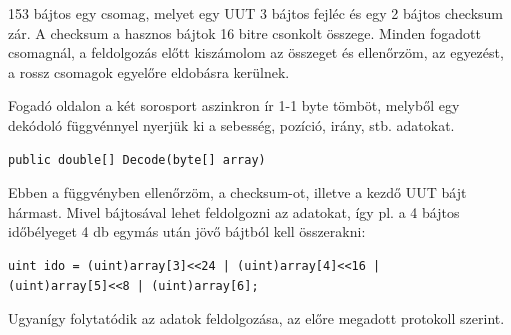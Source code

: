 \documentclass[12pt]{article}
\begin{document}
\begin{itemize}
153 bájtos egy csomag, melyet egy UUT  3 bájtos fejléc és egy 2 bájtos checksum zár. A checksum a hasznos bájtok 16 bitre csonkolt összege. Minden fogadott csomagnál, a feldolgozás el\H{o}tt kiszámolom az összeget és ellen\H{o}rzöm, az egyezést, a rossz csomagok egyel\H{o}re eldobásra kerülnek.

\begin{figure}[H]
	\centering
	\caption{}
	\label{fig:xvi}
\end{figure}

Fogadó oldalon a két sorosport aszinkron ír 1-1 byte tömböt, melyb\H{o}l egy dekódoló függvénnyel nyerjük ki a sebesség, pozíció, irány, stb. adatokat.

\begin{verbatim}
public double[] Decode(byte[] array)
\end{verbatim}

Ebben a függvényben ellen\H{o}rzöm, a checksum-ot, illetve a kezd\H{o} UUT bájt hármast.
Mivel bájtosával lehet feldolgozni az adatokat, így pl. a 4 bájtos id\H{o}bélyeget 4 db egymás után jöv\H{o} bájtból kell összerakni:

\begin{verbatim}
uint ido = (uint)array[3]<<24 | (uint)array[4]<<16 |
(uint)array[5]<<8 | (uint)array[6];
\end{verbatim}

Ugyanígy folytatódik az adatok feldolgozása, az el\H{o}re megadott protokoll szerint.


\end{itemize}
\end{document}
